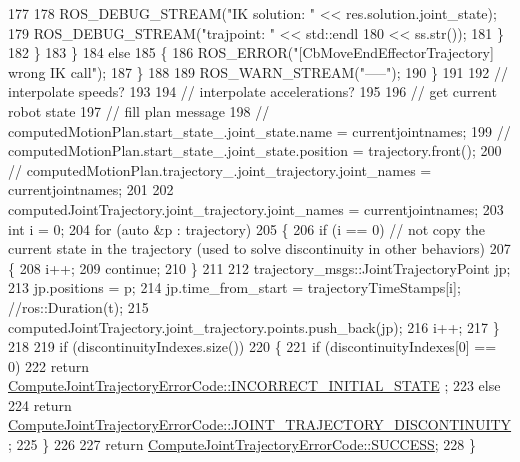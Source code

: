 \begin{DoxyCode}
177 
178                         ROS\_DEBUG\_STREAM(\textcolor{stringliteral}{"IK solution: "} << res.solution.joint\_state);
179                         ROS\_DEBUG\_STREAM(\textcolor{stringliteral}{"trajpoint: "} << std::endl
180                                                       << ss.str());
181                     \}
182                 \}
183             \}
184             \textcolor{keywordflow}{else}
185             \{
186                 ROS\_ERROR(\textcolor{stringliteral}{"[CbMoveEndEffectorTrajectory] wrong IK call"});
187             \}
188 
189             ROS\_WARN\_STREAM(\textcolor{stringliteral}{"-----"});
190         \}
191 
192         \textcolor{comment}{// interpolate speeds?}
193 
194         \textcolor{comment}{// interpolate accelerations?}
195 
196         \textcolor{comment}{// get current robot state}
197         \textcolor{comment}{// fill plan message}
198         \textcolor{comment}{// computedMotionPlan.start\_state\_.joint\_state.name = currentjointnames;}
199         \textcolor{comment}{// computedMotionPlan.start\_state\_.joint\_state.position = trajectory.front();}
200         \textcolor{comment}{// computedMotionPlan.trajectory\_.joint\_trajectory.joint\_names = currentjointnames;}
201 
202         computedJointTrajectory.joint\_trajectory.joint\_names = currentjointnames;
203         \textcolor{keywordtype}{int} i = 0;
204         \textcolor{keywordflow}{for} (\textcolor{keyword}{auto} &p : trajectory)
205         \{
206             \textcolor{keywordflow}{if} (i == 0) \textcolor{comment}{// not copy the current state in the trajectory (used to solve discontinuity in
       other behaviors)}
207             \{
208                 i++;
209                 \textcolor{keywordflow}{continue};
210             \}
211 
212             trajectory\_msgs::JointTrajectoryPoint jp;
213             jp.positions = p;
214             jp.time\_from\_start = trajectoryTimeStamps[i]; \textcolor{comment}{//ros::Duration(t);}
215             computedJointTrajectory.joint\_trajectory.points.push\_back(jp);
216             i++;
217         \}
218 
219         \textcolor{keywordflow}{if} (discontinuityIndexes.size())
220         \{
221             \textcolor{keywordflow}{if} (discontinuityIndexes[0] == 0)
222                 \textcolor{keywordflow}{return} \hyperlink{namespacecl__move__group__interface_ae5fc1caf9a16ae5ad1c97c2e137a7017a1b748367c8d468cb9b65ecd6b2eab32c}{ComputeJointTrajectoryErrorCode::INCORRECT\_INITIAL\_STATE}
      ;
223             \textcolor{keywordflow}{else}
224                 \textcolor{keywordflow}{return} 
      \hyperlink{namespacecl__move__group__interface_ae5fc1caf9a16ae5ad1c97c2e137a7017a3e86842785cd7c42003e516418347c8e}{ComputeJointTrajectoryErrorCode::JOINT\_TRAJECTORY\_DISCONTINUITY}
      ;
225         \}
226 
227         \textcolor{keywordflow}{return} \hyperlink{namespacecl__move__group__interface_ae5fc1caf9a16ae5ad1c97c2e137a7017ad0749aaba8b833466dfcbb0428e4f89c}{ComputeJointTrajectoryErrorCode::SUCCESS};
228     \}
\end{DoxyCode}
